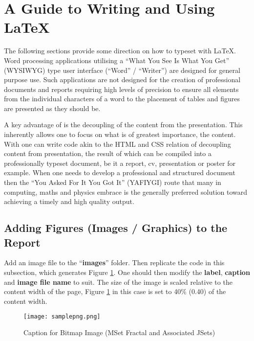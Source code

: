 \clearpage %

\section{A Guide to Writing and Using \LaTeX} \label{sec:UsingLaTeXGuide}
The following sections provide some direction on how to typeset with \LaTeX. Word processing applications utilising  a ``What You See Is What You Get'' (WYSIWYG) type user interface (``Word'' / ``Writer'') are designed for general purpose use. Such applications are not designed for the creation of professional documents and reports requiring high levels of precision to ensure all elements from the individual characters of a word to the placement of tables and figures are presented as they should be. 

A key advantage of \latex is the decoupling of the content from the presentation. This inherently allows one to focus on what is of greatest importance, the content. With \latex one can write code akin to the HTML and CSS relation of decoupling content from presentation, the result of which can be compiled into a professionally typeset document, be it a report, cv, presentation or poster for example. When one needs to develop a professional and structured document then the ``You Asked For It You Got It'' (YAFIYGI) route that many in computing, maths and physics embrace is the generally preferred solution toward achieving a timely and high quality output. 

\subsection{Adding Figures (Images / Graphics) to the Report}

Add an image file to the ``\textbf{images}'' folder. Then replicate the code in this subsection, which generates Figure \ref{fig:samplepngImage}. One should then modify the \textbf{label}, \textbf{caption} and \textbf{image file name} to suit. The size of the image is scaled relative to the content width of the page, Figure \ref{fig:samplepngImage} in this case is set to 40\% (0.40) of the content width. 

\begin{figure}[H]
\begin{center}
\texttt{[image: samplepng.png]}
\caption{Caption for Bitmap Image (MSet Fractal and Associated JSets)} \label{fig:samplepngImage}
\end{center}
\end{figure}
